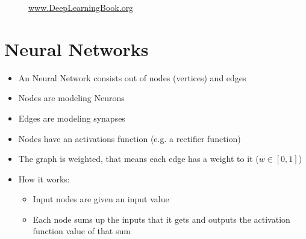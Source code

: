 \documentclass[t]{beamer} %
\begin{document}
\begin{frame}
\begin{itemize}
\begin{figure}
\begin{minipage}{0.45\textwidth}
\begin{figure}[]
                \end{figure}
            \end{minipage}
            \caption{\href{http://www.deeplearningbook.org}{www.DeepLearningBook.org}}
        \end{figure}
    \end{itemize}
\end{frame}

\section{Neural Networks}

\begin{frame}
    \begin{itemize}[<+->]
        \item An Neural Network consists out of nodes (vertices) and edges
        \item Nodes are modeling Neurons
        \item Edges are modeling synapses
        \item Nodes have an activations function (e.g. a rectifier function)
        \item The graph is weighted, that means each edge has a weight to it (\(w \in [0, 1]\))
    \end{itemize}

    \begin{itemize}[<+->]
        \item How it works:
        \begin{itemize}[<+->]
            \item Input nodes are given an input value
            \item Each node sums up the inputs that it gets and outputs the activation function value of that sum
        \end{itemize}
    \end{itemize}
\end{frame}
\end{document}
